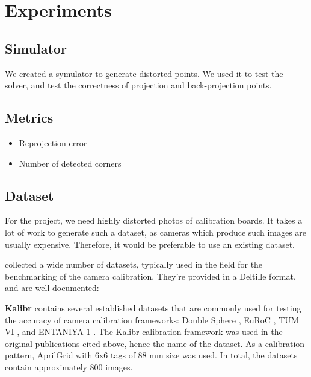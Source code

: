 \chapter{Experiments}\label{cha:experiments}

\section{Simulator}\label{sec:simulator}

We created a symulator to generate distorted points. We used it to test the
solver, and test the correctness of projection and back-projection points.

\section{Metrics}\label{sec:metrics}

\begin{itemize}
	\item Reprojection error
	\item Number of detected corners
\end{itemize}

\section{Dataset}\label{sec:dataset}

For the project, we need highly distorted photos of calibration boards. It takes
a lot of work to generate such a dataset, as cameras which produce such images are
usually expensive. Therefore, it would be preferable to use an existing dataset.

\textcite{lochmanBabelCalibUniversalApproach2021} collected a wide number of
datasets, typically used in the field for the benchmarking of the camera
calibration. They're provided in a Deltille \cite{DeltilleDetector2023} format,
and are well documented:

\textbf{Kalibr} contains several established datasets that are commonly used for testing
the accuracy of camera calibration frameworks: Double Sphere
\cite{usenkoDoubleSphereCamera2018}, EuRoC \cite{burriEuRoCMicroAerial2016}, TUM
VI \cite{schubertTUMVIBenchmark2018}, and ENTANIYA 1
\cite{Calibration250degFisheye}.
The Kalibr calibration framework was used in the
original publications cited above, hence the name of the dataset.
As a calibration pattern, AprilGrid with 6x6 tags of 88 mm size was used.
In total, the datasets contain approximately 800 images.

